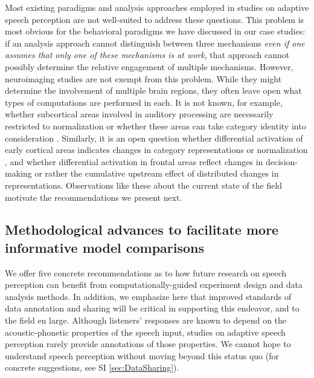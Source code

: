 \documentclass[
  11pt,
  man,floatsintext]{apa6}
\begin{document}
Most existing paradigms and analysis approaches employed in studies on adaptive speech perception are not well-suited to address these questions. This problem is most obvious for the behavioral paradigms we have discussed in our case studies: if an analysis approach cannot distinguish between three mechanisms \emph{even if one assumes that only one of these mechanisms is at work}, that approach cannot possibly determine the relative engagement of multiple mechanisms. However, neuroimaging studies are not exempt from this problem. While they might determine the involvement of multiple brain regions, they often leave open what types of computations are performed in each. It is not known, for example, whether subcortical areas involved in auditory processing are necessarily restricted to normalization or whether these areas can take category identity into consideration \autocite[e.g., through documented feedback projections from cortical areas,][]{Erb2013}. Similarly, it is an open question whether differential activation of early cortical areas indicates changes in category representations or normalization \autocite[e.g., the involvement of Heschl's gyrus in adaptive speech perception,][]{sjerps2019}, and whether differential activation in frontal areas reflect changes in decision-making \autocite[as seems to be assumed in, e.g.,][]{myers-mesite2014} or rather the cumulative upstream effect of distributed changes in representations. Observations like these about the current state of the field motivate the recommendations we present next.

\hypertarget{sec:methodological-advances}{%
\subsection{Methodological advances to facilitate more informative model comparisons}\label{sec:methodological-advances}}

We offer five concrete recommendations as to how future research on speech perception can benefit from computationally-guided experiment design and data analysis methods. In addition, we emphasize here that improved standards of data annotation and sharing will be critical in supporting this endeavor, and to the field en large. Although listeners' responses are known to depend on the acoustic-phonetic properties of the speech input, studies on adaptive speech perception rarely provide annotations of those properties. We cannot hope to understand speech perception without moving beyond this status quo (for concrete suggestions, see SI \ref{sec:DataSharing}).
\end{document}
